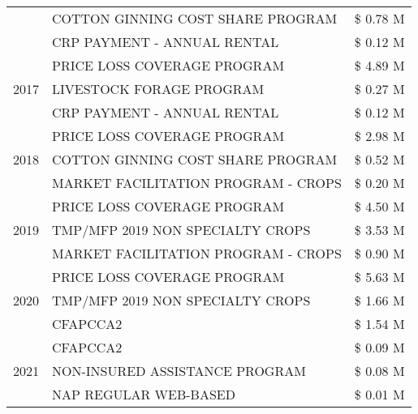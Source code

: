 \begin{tabular}{llr}
 & COTTON GINNING COST SHARE PROGRAM             & \$ 0.78 M \\
 & CRP PAYMENT - ANNUAL RENTAL                   & \$ 0.12 M \\
\cline{1-3}
\multirow[t]{3}{*}{2017} & PRICE LOSS COVERAGE PROGRAM & \$ 4.89 M \\
 & LIVESTOCK FORAGE PROGRAM & \$ 0.27 M \\
 & CRP PAYMENT - ANNUAL RENTAL & \$ 0.12 M \\
\cline{1-3}
\multirow[t]{3}{*}{2018} & PRICE LOSS COVERAGE PROGRAM & \$ 2.98 M \\
 & COTTON GINNING COST SHARE PROGRAM & \$ 0.52 M \\
 & MARKET FACILITATION PROGRAM - CROPS & \$ 0.20 M \\
\cline{1-3}
\multirow[t]{3}{*}{2019} & PRICE LOSS COVERAGE PROGRAM & \$ 4.50 M \\
 & TMP/MFP 2019 NON SPECIALTY CROPS & \$ 3.53 M \\
 & MARKET FACILITATION PROGRAM - CROPS & \$ 0.90 M \\
\cline{1-3}
\multirow[t]{3}{*}{2020} & PRICE LOSS COVERAGE PROGRAM & \$ 5.63 M \\
 & TMP/MFP 2019 NON SPECIALTY CROPS & \$ 1.66 M \\
 & CFAPCCA2 & \$ 1.54 M \\
\cline{1-3}
\multirow[t]{3}{*}{2021} & CFAPCCA2 & \$ 0.09 M \\
 & NON-INSURED ASSISTANCE PROGRAM & \$ 0.08 M \\
 & NAP REGULAR WEB-BASED & \$ 0.01 M \\
\cline{1-3}
\bottomrule
\end{tabular}
